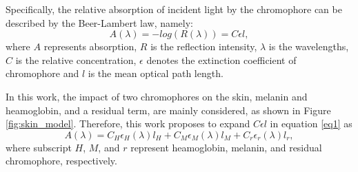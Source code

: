 \begin{spacing}{1.5}
Specifically, the relative absorption of incident light by the chromophore can be described by the Beer-Lambert law\cite{spigulis2017smartphone}, namely:
\begin{equation}
    A(\lambda) = -log(R(\lambda)) = C\epsilon l,
    \label{eq1}
\end{equation}
where $A$ represents absorption, $R$ is the reflection intensity, $\lambda$ is the wavelengths, $C$ is the relative concentration, $\epsilon$ denotes the extinction coefficient of chromophore and $l$ is the mean optical path length.

In this work, the impact of two chromophores on the skin, melanin and heamoglobin, and a residual term, are mainly considered, as shown in Figure \ref{fig:skin_model}. Therefore, this work proposes to expand $C\epsilon l$ in equation \ref{eq1} as
\begin{equation}
    A(\lambda) = C_H\epsilon_H(\lambda)l_H + C_M\epsilon_M(\lambda)l_M + C_r\epsilon_r(\lambda)l_r,
    \label{eq2}
\end{equation}
where subscript $H$, $M$, and $r$ represent heamoglobin, melanin, and residual chromophore, respectively.


\end{spacing}
